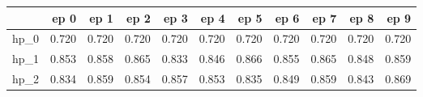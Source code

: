 \begin{tabular}{lrrrrrrrrrr}
\toprule
{} &   ep 0 &   ep 1 &   ep 2 &   ep 3 &   ep 4 &   ep 5 &   ep 6 &   ep 7 &   ep 8 &   ep 9 \\
\midrule
hp\_0 &  0.720 &  0.720 &  0.720 &  0.720 &  0.720 &  0.720 &  0.720 &  0.720 &  0.720 &  0.720 \\
hp\_1 &  0.853 &  0.858 &  0.865 &  0.833 &  0.846 &  0.866 &  0.855 &  0.865 &  0.848 &  0.859 \\
hp\_2 &  0.834 &  0.859 &  0.854 &  0.857 &  0.853 &  0.835 &  0.849 &  0.859 &  0.843 &  0.869 \\
\bottomrule
\end{tabular}
